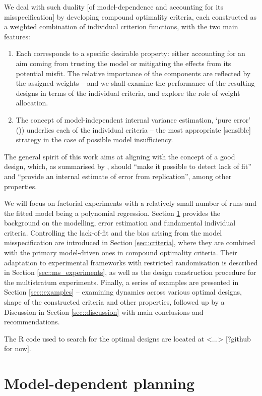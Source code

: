 \documentclass[11pt]{article}
\begin{document}
We deal with such duality [of model-dependence and accounting for its misspecification] by developing compound optimality criteria, each constructed as a weighted combination of individual criterion functions, with the two main features:
\begin{enumerate}
	\item Each corresponds to a specific desirable property:  either accounting for an aim coming from trusting the model or mitigating the effects from its potential misfit. The relative importance of the components are reflected by the assigned weights -- and we shall examine the performance of the resulting designs in terms of the individual criteria, and explore the role of weight allocation.
	\item The concept of model-independent internal variance estimation, `pure error' (\cite{GilmourTrinca2012})) underlies each of the individual criteria -- the most appropriate [sensible] strategy in the case of possible model insufficiency. 
 \end{enumerate}

The general spirit of this work aims at aligning with the concept of a good design, which, as summarised by \cite{Box1987empirical},  should ``make it possible to detect lack of fit'' and ``provide an internal estimate of error from replication'', among other properties. 

We will focus on factorial experiments with a relatively small number of runs and the fitted model being a polynomial regression. Section \ref{sec::background} provides the background on the modelling, error estimation and fundamental individual criteria. Controlling the lack-of-fit and the bias arising from the model misspecification are introduced in Section \ref{sec::criteria}, where they are combined with the primary model-driven ones in compound optimality criteria. Their adaptation to experimental frameworks with restricted randomisation is described in Section \ref{sec::ms_experiments}, as well as the design construction procedure for the multistratum experiments. Finally, a series of examples are presented in Section \ref{sec::examples} -- examining dynamics across various optimal designs,  shape of the constructed criteria and other properties, followed up by a Discussion in Section \ref{sec::discussion} with main conclusions and recommendations. 

The $\mbox{R}$ code used to search for the optimal designs are located at <...> [?github for now].

\section{Model-dependent planning}
\label{sec::background}
\end{document}
